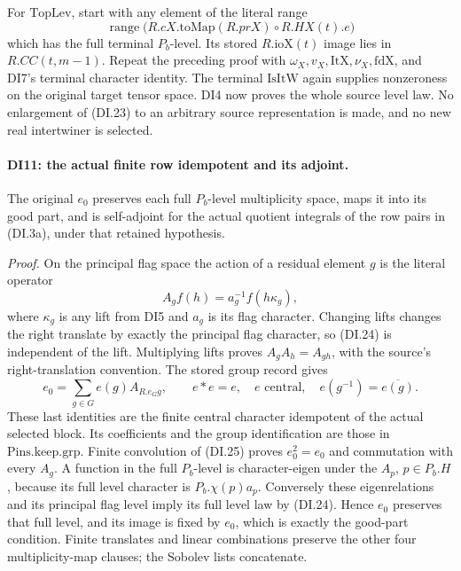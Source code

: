 For \(\mathrm{TopLev}\), start with any element of the literal
range
\[
        \operatorname{range}\bigl(R.cX.\mathrm{toMap}(R.prX)
                                      \circ R.HX(t).e\bigr)
 \tag{DI.23}
\]
which has the full terminal \(P_b\)-level. Its stored
\(R.\mathrm{ioX}(t)\) image lies in \(R.CC(t,m-1)\).
Repeat the preceding proof with \(\omega_X,v_X,\mathrm{ItX},
\nu_X,\mathrm{fdX}\), and DI7's terminal character identity.
The terminal \(\mathrm{IsItW}\) again supplies nonzeroness on the
original target tensor space. DI4 now proves the whole source level
law. No enlargement of (DI.23) to an arbitrary source representation
is made, and no new real intertwiner is selected.

\paragraph{DI11: the actual finite row idempotent and its adjoint.}
\label{claim:DI11}
The original \(e_0\) preserves each full \(P_b\)-level
multiplicity space, maps it into its good part, and is self-adjoint
for the actual quotient integrals of the row pairs in (DI.3a),
under that retained hypothesis.

\emph{Proof.}
On the principal flag space the action of a residual element \(g\)
is the literal operator
\[
             A_gf(h)=a_g^{-1}f(h\kappa_g),
 \tag{DI.24}
\]
where \(\kappa_g\) is any lift from DI5 and \(a_g\) is its flag
character. Changing lifts changes the right translate by exactly the
principal flag character, so (DI.24) is independent of the lift.
Multiplying lifts proves \(A_gA_h=A_{gh}\), with the source's
right-translation convention. The stored group record gives
\[
                 e_0=\sum_{g\in G}e(g)A_{R.e_Gg},
 \qquad e*e=e,\quad e\text{ central},\quad
                     e(g^{-1})=\overline{e(g)}.
 \tag{DI.25}
\]
These last identities are the finite central character idempotent
of the actual selected block. Its coefficients and the group
identification are those in \(\mathrm{Pins}.\mathrm{keep}.\mathrm{grp}\).
Finite convolution of (DI.25) proves \(e_0^2=e_0\) and commutation
with every \(A_g\). A function in the full \(P_b\)-level is
character-eigen under the \(A_p\), \(p\in P_b.H\), because its
full level character is \(P_b.\chi(p)a_p\). Conversely these
eigenrelations and its principal flag level imply its full level
law by (DI.24). Hence \(e_0\) preserves that full level, and its
image is fixed by \(e_0\), which is exactly the good-part condition.
Finite translates and linear combinations preserve the other four
multiplicity-map clauses; the Sobolev lists concatenate.


